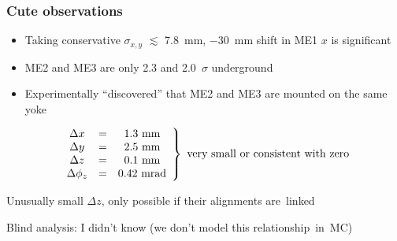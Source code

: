 \documentclass[compress]{beamer}
\begin{document}
\begin{frame}
\frametitle{Cute observations}

\begin{itemize}\setlength{\itemsep}{0.3 cm}
\item Taking conservative $\sigma_{x,y}$ $\lesssim$ 7.8~mm, $-$30~mm shift in ME1 $x$ is significant

\item ME2 and ME3 are only 2.3 and 2.0~$\sigma$ underground

\item Experimentally ``discovered'' that ME2 and ME3 are mounted on the same yoke

\end{itemize}

\vspace{-0.5 cm}
\[ \left.\begin{array}{c c c} \Delta x &=& \mbox{1.3~mm} \\ \Delta y &=& \mbox{2.5~mm} \\ \Delta z &=& \mbox{0.1~mm} \\ \Delta \phi_z &=& \mbox{0.42~mrad} \end{array}\right\} \mbox{ very small or consistent with zero} \]

\vfill
Unusually small $\Delta z$, only possible if their alignments \mbox{are linked\hspace{-1 cm}}

\vfill
Blind analysis: I didn't know (we don't model this \mbox{relationship in MC)\hspace{-1 cm}}
\end{frame}
\end{document}
